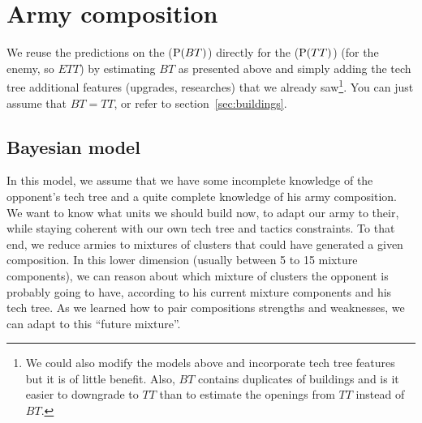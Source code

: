 \section{Army composition}
\label{sec:armycomposition}
We reuse the predictions on the  ($\mathrm{P}(BT)$) directly for the  ($\mathrm{P}(TT)$) (for the enemy, so $ETT$) by estimating $BT$ as presented above and simply adding the tech tree additional features (upgrades, researches) that we already saw\footnote{We could also modify the models above and incorporate tech tree features but it is of little benefit. Also, $BT$ contains duplicates of buildings and is it easier to downgrade to $TT$ than to estimate the openings from $TT$ instead of $BT$.}. You can just assume that $BT=TT$, or refer to section~\ref{sec:buildings}.

\subsection{Bayesian model}

In this model, we assume that we have some incomplete knowledge of the opponent's tech tree and a quite complete knowledge of his army composition. We want to know what units we should build now, to adapt our army to their, while staying coherent with our own tech tree and tactics constraints. To that end, we reduce armies to mixtures of clusters that could have generated a given composition. In this lower dimension (usually between 5 to 15 mixture components), %
we can reason about which mixture of clusters the opponent is probably going to have, according to his current mixture components and his tech tree. As we learned how to pair compositions strengths and weaknesses, we can adapt to this ``future mixture''. %

